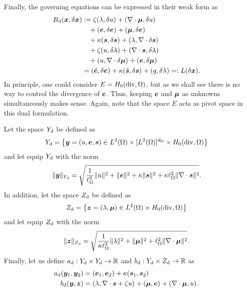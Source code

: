 Finally, the governing equations can be expressed in their weak form as
%
\begin{align*}
\Bd(\xF,\delta\xF)
&:=     \zeta\iprod[]{\lF}{           \delta\uF}+\iprod[]{\nabla\cdot\mF}{           \delta\uF}\\
&\quad      +\iprod[]{\eF}{           \delta\eF}+\iprod[]{           \mF}{           \delta\eF}\\
&\quad+\kappa\iprod[]{\sF}{           \delta\sF}+\iprod[]{           \lF}{\nabla\cdot\delta\sF}\\
&\quad+ \zeta\iprod[]{\uF}{           \delta\lF}+\iprod[]{\nabla\cdot\sF}{           \delta\lF}\\
&\quad      +\iprod[]{\uF}{\nabla\cdot\delta\mF}+\iprod[]{           \eF}{           \delta\mF}\\
&= \iprod[]{\eFt}{\delta\eF}+\kappa\iprod[]{\sFt}{\delta\sF}+\iprod[]{q}{\delta\lF} =: L(\delta \xF). 
\end{align*}
%
In principle, one could consider $E = \Hdivz$, but as we shall see there is no way to control the divergence of $\eF$. Thus, keeping $\eF$ and $\mF$ as unknowns simultaneously makes sense. Again, note that the space $E$ acts as pivot space in this dual formulation.

\begin{definition} 
Let the space $\YSd$ be defined as
$$
\YSd = \left\lbrace\yF = (\uF,\eF,\sF)\in\Ltwo\times[\Ltwo]^\dimo\times\Hdivz\right\rbrace
$$
and let equip $\YSd$ with the norm
$$
\norm[\YSd]{\yF} = \sqrt{
\frac{1}{\length^2}\norm[]{\uF}^2+
                   \norm[]{\eF}^2+
             \kappa\norm[]{\sF}^2+
    \kappa\length^2\norm[]{\nabla\cdot\sF}^2}.
$$
In addition, let the space $\ZSd$ be defined as
$$
\ZSd = \left\lbrace\zF = (\lF,\mF)\in\Ltwo\times\Hdivz\right\rbrace
$$
and let equip $\ZSd$ with the norm
$$
\norm[\ZSd]{\zF} = \sqrt{
\frac{1}{\kappa\length^2}\norm[]{\lF}^2+
                         \norm[]{\mF}^2+
\length^2                \norm[]{\nabla\cdot\mF}^2}.
$$
Finally, let us define $\ad: \YSd\times\YSd\rightarrow \mathbb{R}$ and $\bd : \YSd\times \ZSd \rightarrow \mathbb{R}$ as
\begin{align}
\ad(\yF_1,\yF_2) & = \iprod[]{\eF_1}{\eF_2} + \kappa \iprod[]{\sF_1}{\sF_2}  \label{eq:defad}\\
\bd(\yF,\zF) & =
\iprod[]{\lF}{\nabla\cdot\sF+\zeta\uF}+\iprod[]{\mF}{\eF}+\iprod[]{\nabla\cdot\mF}{\uF}.\label{eq:defbd}
\end{align}
\end{definition}

